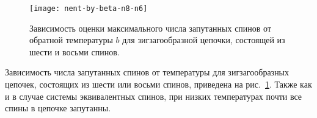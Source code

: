 \begin{figure}[H]
  \centering
  \texttt{[image: nent-by-beta-n8-n6]}				
  \caption{
    Зависимость оценки максимального числа запутанных спинов от обратной температуры $b$
    для зигзагообразной цепочки,
    состоящей из шести и восьми спинов.
    }
    \label{fig:fig7}
\end{figure}

Зависимость числа запутанных спинов от температуры для зигзагообразных цепочек,
состоящих из шести или восьми спинов, приведена на рис.~\ref{fig:fig7}.
Также как и в случае системы эквивалентных спинов,
при низких температурах почти все спины в цепочке запутанны.


%
%


